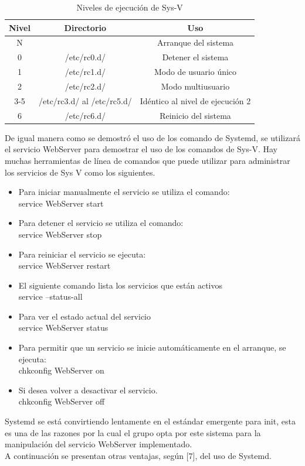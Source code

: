 \documentclass[conference]{IEEEtran}
\begin{document}
\begin{table}[ht]
\centering
\caption{Niveles de ejecución de Sys-V}
\begin{tabular}{|c|c|c|}
\hline
\textbf{Nivel} & \textbf{Directorio} & \textbf{Uso} \\ \hline
N &   & Arranque del sistema \\ \hline
0 & /etc/rc0.d/ & Detener el sistema \\ \hline
1 & /etc/rc1.d/ & Modo de usuario único \\ \hline
2 & /etc/rc2.d/ & Modo multiusuario \\ \hline
3-5 & /etc/rc3.d/ al /etc/rc5.d/ & Idéntico al nivel de ejecución 2 \\ \hline
6 & /etc/rc6.d/ & Reinicio del sistema \\ \hline
\end{tabular}
\end{table}
De igual manera como se demostró el uso de los comando de Systemd, se utilizará el servicio WebServer para demostrar el uso de los comandos de Sys-V. Hay muchas herramientas de línea de comandos que puede utilizar para administrar los servicios de Sys V como los siguientes.
\begin{itemize}
\item Para iniciar manualmente el servicio se utiliza el comando:
\\service WebServer start
\item Para detener el servicio se utiliza el comando:
\\service WebServer stop
\item Para reiniciar el servicio se ejecuta:
\\service WebServer restart
\item El siguiente comando lista los servicios que están activos
\\service --status-all
\item Para ver el estado actual del servicio
\\service WebServer status
\item Para permitir que un servicio se inicie automáticamente en el arranque, se ejecuta:
\\chkconfig WebServer on
\item Si desea volver a desactivar el servicio.
\\chkconfig WebServer off
\end{itemize}
Systemd se está convirtiendo lentamente en el estándar emergente para init, esta es una de las razones por la cual el grupo opta por este sistema para la manipulación del servicio WebServer implementado. 
\\A continuación se presentan otras ventajas, según [7], del uso de Systemd.
\end{document}
